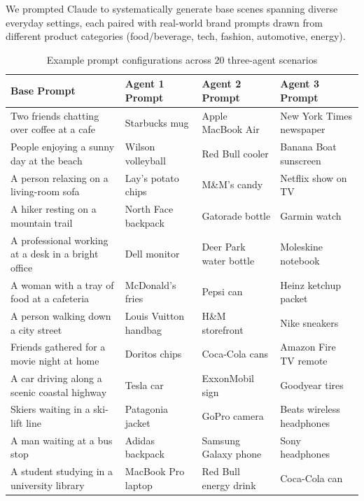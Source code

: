 \documentclass[format=acmsmall, review=false]{acmart}
\begin{document}
We prompted Claude to systematically generate base scenes spanning diverse everyday settings, each paired with  real-world brand prompts drawn from different product categories (food/beverage, tech, fashion, automotive, energy).

\vspace{-0.5\baselineskip}
\begin{table}[H]
\captionsetup{skip=2pt}
\caption{Example prompt configurations across $20$ three-agent scenarios}
\centering
\footnotesize
\begin{tabular}{>{\raggedright\arraybackslash}p{3.5cm} 
                >{\raggedright\arraybackslash}p{2.9cm} 
                >{\raggedright\arraybackslash}p{2.9cm}
                >{\raggedright\arraybackslash}p{2.9cm}}
\toprule
\textbf{Base Prompt} & \textbf{Agent 1 Prompt} & \textbf{Agent 2 Prompt} & \textbf{Agent 3 Prompt} \\
\midrule
Two friends chatting over coffee at a cafe & Starbucks mug & Apple MacBook Air & New York Times newspaper \\ \hline
People enjoying a sunny day at the beach & Wilson volleyball & Red Bull cooler & Banana Boat sunscreen \\ \hline
A person relaxing on a living-room sofa & Lay's potato chips & M\&M's candy & Netflix show on TV \\ \hline
A hiker resting on a mountain trail & North Face backpack & Gatorade bottle & Garmin watch \\ \hline
A professional working at a desk in a bright office & Dell monitor & Deer Park water bottle & Moleskine notebook \\ \hline
A woman with a tray of food at a cafeteria & McDonald's fries & Pepsi can & Heinz ketchup packet \\ \hline
A person walking down a city street & Louis Vuitton handbag & H\&M storefront & Nike sneakers \\ \hline
Friends gathered for a movie night at home & Doritos chips & Coca-Cola cans & Amazon Fire TV remote \\ \hline
A car driving along a scenic coastal highway & Tesla car & ExxonMobil sign & Goodyear tires \\ \hline
Skiers waiting in a ski-lift line & Patagonia jacket & GoPro camera & Beats wireless headphones \\ \hline
A man waiting at a bus stop & Adidas backpack & Samsung Galaxy phone & Sony headphones \\ \hline
A student studying in a university library & MacBook Pro laptop & Red Bull energy drink & Coca-Cola can \\ \hline

\end{tabular}
\end{table}
\end{document}
